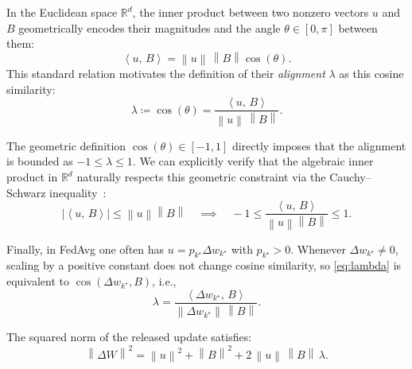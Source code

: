 \documentclass[bdcc,article,submit,pdftex]{Definitions/mdpi}
\newcommand{\R}{\mathbb{R}}
\newcommand{\ip}[2]{\left\langle #1,\,#2 \right\rangle}
\newcommand{\norm}[1]{\left\lVert #1 \right\rVert}
\newcommand{\tindex}{k^\star}
\newcommand{\utarget}{u}
\begin{document}
\begin{Definition}
\label{def:lambda}
In the Euclidean space $\R^d$, the inner product between two nonzero vectors $\utarget$ and $B$ geometrically encodes their magnitudes and the angle $\theta \in [0, \pi]$ between them:
\begin{equation}
\label{eq:inner_prod_geom}
\ip{\utarget}{B} = \norm{\utarget}\,\norm{B}\cos(\theta).
\end{equation}
This standard relation motivates the definition of their \emph{alignment} $\lambda$ as this cosine similarity:
\begin{equation}
\label{eq:lambda}
\lambda \coloneqq \cos(\theta)
= \frac{\ip{\utarget}{B}}{\norm{\utarget}\,\norm{B}}.
\end{equation}
\end{Definition}

\begin{Lemma}
\label{prop:lambda_bounds}
The geometric definition $\cos(\theta) \in [-1, 1]$ directly imposes that the alignment is bounded as $-1 \le \lambda \le 1$. We can explicitly verify that the algebraic inner product in $\R^d$ naturally respects this geometric constraint via the Cauchy--Schwarz inequality~\cite{steele2004cauchy}:
\begin{equation*}
\big|\ip{\utarget}{B}\big| \le \norm{\utarget}\norm{B} \quad \implies \quad -1 \le \frac{\ip{\utarget}{B}}{\norm{\utarget}\norm{B}} \le 1.
\end{equation*}
\end{Lemma}

Finally, in FedAvg one often has $\utarget = p_{\tindex}\Delta w_{\tindex}$ with $p_{\tindex}>0$.
Whenever $\Delta w_{\tindex}\neq 0$, scaling by a positive constant does not change cosine similarity,
so \eqref{eq:lambda} is equivalent to $\cos(\Delta w_{\tindex},B)$, i.e.,
\begin{equation}
\lambda
= \frac{\ip{\Delta w_{\tindex}}{B}}{\norm{\Delta w_{\tindex}}\,\norm{B}}.
\end{equation}

\begin{Lemma}
\label{prop:energy}
The squared norm of the released update satisfies:
\begin{equation}
\label{eq:energy_lambda}
\norm{\Delta W}^2
=
\norm{\utarget}^2 + \norm{B}^2 + 2\,\norm{\utarget}\,\norm{B}\,\lambda.
\end{equation}
\end{Lemma}
\end{document}
